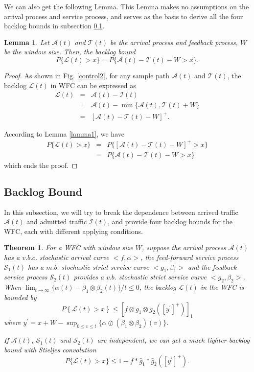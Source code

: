 \documentclass[12pt]{article}
\newtheorem{theorem}{Theorem}
\newtheorem{lemma}{Lemma}
\newtheorem{proof}{Proof}
\def \QED {\hfill \vrule height6pt width 6pt depth 0pt}
\begin{document}
We can also get the following Lemma. This Lemma makes no assumptions on the arrival process and service process, and serves as the basis to derive all the four backlog bounds in subsection \ref{backlog}.
\begin{lemma}\label{lama2}
Let $\mathcal{A}(t)$ and $\mathcal{T}(t)$ be the arrival process and feedback process, $W$ be the window size. Then, the backlog bound
$$P\{\mathcal{L}(t)> x\}=P\{\mathcal{A}(t)-\mathcal{T}(t)-W> x\}.$$
\end{lemma}
\begin{proof}
As shown in Fig. \ref{control2}, for any sample path $\mathcal{A}(t)$ and $\mathcal{T}(t)$, the backlog $\mathcal{L}(t)$ in WFC can be expressed as
\begin{eqnarray}
  \mathcal{L}(t)&=&\mathcal{A}(t)-\mathcal{I}(t)\nonumber\\
      &=&\mathcal{A}(t)-\min\{\mathcal{A}(t),\mathcal{T}(t)+W\}\nonumber\\
      &=&[\mathcal{A}(t)-\mathcal{T}(t)-W]^+.\nonumber
\end{eqnarray}

According to Lemma \ref{lamma1}, we have
\begin{eqnarray*}
  P\{\mathcal{L}(t)>x\}&=&P\{[\mathcal{A}(t)-\mathcal{T}(t)-W]^+>x\}\\
  &=&P\{\mathcal{A}(t)-\mathcal{T}(t)-W>x\}
\end{eqnarray*}
which ends the proof.\QED
\end{proof}

\subsection{Backlog Bound}\label{backlog}
In this subsection, we will try to break the dependence between arrived traffic $\mathcal{A}(t)$ and admitted traffic $\mathcal{I}(t)$, and provide four backlog bounds for the WFC, each with different applying conditions.
\begin{theorem}\label{theorem1}
For a WFC with window size $W$, suppose the arrival process $\mathcal{A}(t)$ has a $v.b.c.$ stochastic arrival curve $<f,\alpha>$, the feed-forward service process $\mathcal{S}_1(t)$ has a $m.b.$ stochastic strict service curve $<g_1,\beta_1>$ and the feedback service process $\mathcal{S}_2(t)$ provides a $v.b.$ stochastic strict service curve $<g_2,\beta_2>$. When $\lim_{t\to\infty}\{\alpha(t)-\beta_1\otimes\beta_2(t)\}/t\leq 0$, the backlog $\mathcal{L}(t)$ in the WFC is bounded by
\begin{equation}\label{eqn1}
P\left\{\mathcal{L}(t)>x\right\}\leq [f\otimes g_1\otimes g_2([y^\prime]^+)]_1
\end{equation}
where $y^\prime=x+W-\sup_{0\leq v\leq t}\{\alpha\oslash(\beta_1\otimes\beta_2)(v)\}$.

If $\mathcal{A}(t)$, $\mathcal{S}_1(t)$ and $\mathcal{S}_2(t)$ are independent, we can get a much tighter backlog bound with Stieljes convolution
\begin{equation}\label{eqn2}
P\{\mathcal{L}(t)>x\}\leq 1-\bar{f}\ast\bar{g}_1\ast\bar{g}_2([y^\prime]^+).
\end{equation}
\end{theorem}
\end{document}
